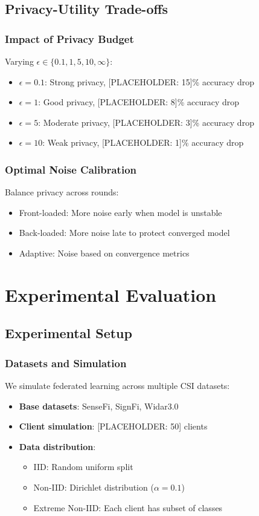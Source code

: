\documentclass[journal]{IEEEtran}
\begin{document}
\subsection{Privacy-Utility Trade-offs}

\subsubsection{Impact of Privacy Budget}
Varying $\epsilon \in \{0.1, 1, 5, 10, \infty\}$:
\begin{itemize}
\item $\epsilon = 0.1$: Strong privacy, [PLACEHOLDER: 15]\% accuracy drop
\item $\epsilon = 1$: Good privacy, [PLACEHOLDER: 8]\% accuracy drop
\item $\epsilon = 5$: Moderate privacy, [PLACEHOLDER: 3]\% accuracy drop
\item $\epsilon = 10$: Weak privacy, [PLACEHOLDER: 1]\% accuracy drop
\end{itemize}

\subsubsection{Optimal Noise Calibration}
Balance privacy across rounds:
\begin{itemize}
\item Front-loaded: More noise early when model is unstable
\item Back-loaded: More noise late to protect converged model
\item Adaptive: Noise based on convergence metrics
\end{itemize}

\section{Experimental Evaluation}

\subsection{Experimental Setup}

\subsubsection{Datasets and Simulation}
We simulate federated learning across multiple CSI datasets:
\begin{itemize}
\item \textbf{Base datasets}: SenseFi, SignFi, Widar3.0
\item \textbf{Client simulation}: [PLACEHOLDER: 50] clients
\item \textbf{Data distribution}: 
   \begin{itemize}
   \item IID: Random uniform split
   \item Non-IID: Dirichlet distribution ($\alpha = 0.1$)
   \item Extreme Non-IID: Each client has subset of classes
   \end{itemize}
\end{itemize}
\end{document}
